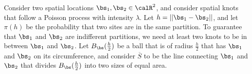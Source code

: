 Consider two spatial locations $\bs_1, \bs_2 \in \calR^2$, and consider spatial knots that follow a Poisson process with intensity $\lambda$.
Let $h = ||\bs_1 - \bs_2||$, and let $\pi(h)$ be the probability that two sites are in the same partition.
To guarantee that $\bs_1$ and $\bs_2$ are indifferent partitions, we need at least two knots to be in between $\bs_1$ and $\bs_2$.
Let $B_{\bs}(\frac{h}{2})$ be a ball that is of radius $\frac{h}{2}$ that has $\bs_1$ and $\bs_2$ on its circumference, and consider $\overline{S}$ to be the line connecting $\bs_1$ and $\bs_2$ that divides $B_{\bs}(\frac{h}{2})$ into two sizes of equal area.

